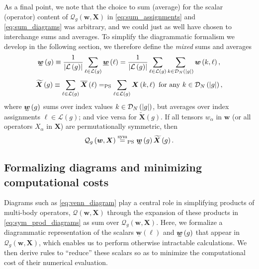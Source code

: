 \documentclass[nofootinbib,notitlepage,11pt]{revtex4-2}
\renewcommand{\t}{\text} %
\newcommand{\f}[2]{\dfrac{#1}{#2}} %
\newcommand{\p}[1]{\left(#1\right)} %
\newcommand{\m}{\bm} %
\newcommand{\1}{\mathds{1}}
\newcommand{\D}{\mathcal{D}}
\renewcommand{\L}{\mathcal{L}}
\newcommand{\Q}{\mathcal{Q}}
\newcommand{\EQPS}{=_{\text{PS}}}
\newcommand{\ut}{\undertilde}
\newcommand{\ot}{\widetilde}
\newcommand{\col}{\underline}
\newcommand{\mean}{\overline}
\begin{document}
As a final point, we note that the choice to sum (average) for the
scalar (operator) content of $\Q_g\p{\m w,\m X}$ in
\eqref{eq:sum_assignments} and \eqref{eq:sum_diagrams} was arbitrary,
and we could just as well have chosen to interchange sums and
averages.  To simplify the diagrammatic formalism we develop in the
following section, we therefore define the {\it mixed} sums and
averages
\begin{align}
  \ut{\m w}\p{g} \equiv \f1{\abs{\L\p{g}}}
  \sum_{\ell\in\L\p{g}} \col{\m w}\p{\ell}
  = \f1{\abs{\L\p{g}}} \sum_{\ell\in\L\p{g}}
  \sum_{k\in\D_N\p{\abs{g}}} \m w\p{k,\ell},
\end{align}
\begin{align}
  \ot{\m X}\p{g} \equiv \sum_{\ell\in\L\p{g}} \mean{\m X}\p{\ell}
  \EQPS \sum_{\ell\in\L\p{g}} \m X\p{k,\ell}
  ~\t{for any}~ k\in\D_N\p{\abs{g}},
\end{align}
where $\ut{\m w}\p{g}$ sums over index values $k\in\D_N\p{\abs{g}}$,
but averages over index assignments $\ell\in\L\p{g}$; and vice versa
for $\ot{\m X}\p{g}$.  If all tensors $w_\alpha$ in $\m w$ (or all
operators $X_\alpha$ in $\m X$) are permutationally symmetric, then
\begin{align}
  \Q_g\p{\m w,\m X} \stackrel{\t{sym}}{=}_{\t{PS}}
  \ut{\m w}\p{g} \ot{\m X}\p{g}.
  \label{eq:sum_diagrams_alt}
\end{align}

\subsection{Formalizing diagrams and minimizing computational costs}
\label{sec:diagrams}

Diagrams such as \eqref{eq:venn_diagram} play a central role in
simplifying products of multi-body operators, $\Q\p{\m w,\m X}$
through the expansion of these products in
\eqref{eq:sym_prod_diagrams} as sum over $\Q_g\p{\m w,\m X}$.  Here,
we formalize a diagrammatic representation of the scalars
$\col{\m w}\p{\ell}$ and $\ut{\m w}\p{g}$ that appear in
$\Q_g\p{\m w,\m X}$, which enables us to perform otherwise intractable
calculations.  We then derive rules to ``reduce'' these scalars so as
to minimize the computational cost of their numerical evaluation.
\end{document}
